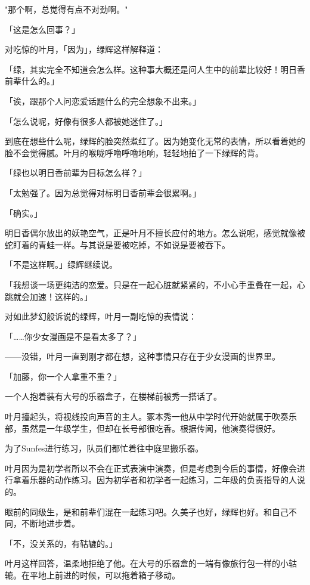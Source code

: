\documentclass[UTF8]{ctexart}
\begin{document}
    "那个啊，总觉得有点不对劲啊。"

    「这是怎么回事？」

    对吃惊的叶月，「因为」，绿辉这样解释道：

    「绿，其实完全不知道会怎么样。这种事大概还是问人生中的前辈比较好！明日香前辈什么的。」

    「诶，跟那个人问恋爱话题什么的完全想象不出来。」

    「怎么说呢，好像有很多人都被她迷住了。」

    到底在想些什么呢，绿辉的脸突然煮红了。因为她变化无常的表情，所以看着她的脸不会觉得腻。叶月的喉咙呼噜呼噜地响，轻轻地拍了一下绿辉的背。

    「绿也以明日香前辈为目标怎么样？」

    「太勉强了。因为总觉得对标明日香前辈会很累啊。」

    「确实。」

    明日香偶尔放出的妖艳空气，正是叶月不擅长应付的地方。怎么说呢，感觉就像被蛇盯着的青蛙一样。与其说是要被吃掉，不如说是要被吞下。

    「不是这样啊。」绿辉继续说。

    「我想谈一场更纯洁的恋爱。只是在一起心脏就紧紧的，不小心手重叠在一起，心跳就会加速！这样的。」

    对如此梦幻般诉说的绿辉，叶月一副吃惊的表情说：

    「……你少女漫画是不是看太多了？」

    ——没错，叶月一直到刚才都在想，这种事情只存在于少女漫画的世界里。

    「加藤，你一个人拿重不重？」

    一个人抱着装有大号的乐器盒子，在楼梯前被秀一搭话了。

    叶月擡起头，将视线投向声音的主人。冢本秀一他从中学时代开始就属于吹奏乐部，虽然是一年级学生，但却在长号部很吃香。根据传闻，他演奏得很好。

    为了Sunfes进行练习，队员们都忙着往中庭里搬乐器。

    叶月因为是初学者所以不会在正式表演中演奏，但是考虑到今后的事情，好像会进行拿着乐器的动作练习。因为初学者和初学者一起练习，二年级的负责指导的人说的。

    眼前的同级生，是和前辈们混在一起练习吧。久美子也好，绿辉也好。和自己不同，不断地进步着。

    「不，没关系的，有轱辘的。」

    叶月这样回答，温柔地拒绝了他。在大号的乐器盒的一端有像旅行包一样的小轱辘。在平地上前进的时候，可以拖着箱子移动。
\end{document}
